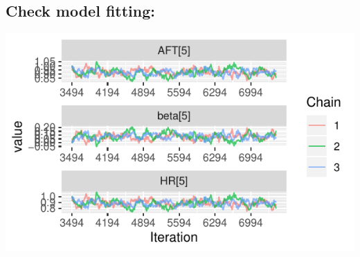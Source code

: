 \documentclass[]{tufte-handout}
\begin{document}
\hypertarget{check-model-fitting}{%
\subsection{Check model fitting:}\label{check-model-fitting}}

\includegraphics{HandOutEngBayes_files/figure-latex/unnamed-chunk-5-1}


\end{document}

